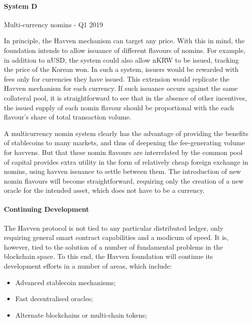 \paragraph{System D} Multi-currency nomins - Q1 2019

In principle, the Havven mechanism can target any price. 
With this in mind, the foundation intends to allow issuance
of different flavours of nomins. For example, in addition to 
nUSD, the system could also allow nKRW to be issued, tracking
the price of the Korean won. In such a system, issuers would be
rewarded with fees only for currencies they have issued. This extension
would replicate the Havven mechanism for each currency. 
If such issuance occurs against the same collateral pool, it is
straightforward to see that in the absence of other incentives,
the issued supply of each nomin flavour should be proportional with the
each flavour's share of total transaction volume.

A multicurrency nomin system clearly has the advantage of providing the
benefits of stablecoins to many markets, and thus of deepening
the fee-generating volume for havvens. But that these nomin flavours
are interrelated by the common pool of capital provides extra utility
in the form of relatively cheap foreign exchange in nomins, using 
havven issuance to settle between them.
The introduction of new nomin flavours will become straightforward,
requiring only the creation of a new oracle for the intended asset,
which does not have to be a currency.


\paragraph{Continuing Development}

The Havven protocol is not tied to any particular distributed ledger,
only requiring general smart contract capabilities and a modicum of speed.
It is, however, tied to the solution of a number of fundamental problems
in the blockchain space. To this end, the Havven foundation will continue
its development efforts in a number of areas, which include:

\begin{itemize}
    \item Advanced stablecoin mechanisms;
    \item Fast decentralised oracles;
    \item Alternate blockchains or multi-chain tokens;
\end{itemize}


